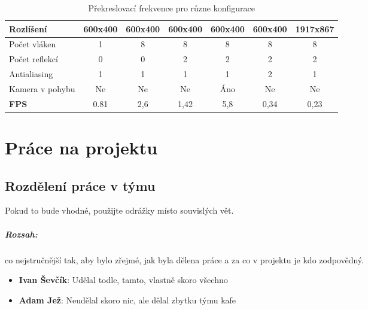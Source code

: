 \documentclass[12pt,a4paper,titlepage,final]{report}
\newcommand\AuthorA{Ivan Ševčík}
\newcommand\AuthorB{Adam Jež}
\begin{document}
\begin{table}[H]
	\begin{center}
		\begin{tabular}{| l | c | c | c | c| c | c |}
			\hline
			Rozlíšení & 600x400 & 600x400 & 600x400 & 600x400 & 600x400 & 1917x867
			\\ \hline
			
			Počet vláken & 1 & 8 & 8 & 8 & 8 & 8
			\\ \hline
			
			Počet reflekcí & 0 & 0 & 2 & 2 & 2 & 2
			\\ \hline
			
			Antialiasing & 1 & 1 & 1 & 1 & 2 & 1
			\\ \hline
			
			Kamera v pohybu & Ne & Ne & Ne & Áno & Ne & Ne
			\\ \hline
			
			\textbf{FPS} & 0.81 & 2,6 & 1,42 & 5,8 & 0,34 & 0,23
			\\ \hline
		\end{tabular}
	\end{center}	
	\caption{Překreslovací frekvence pro různe konfigurace}  
\end{table}

\chapter{Práce na projektu}

\section{Rozdělení práce v týmu}
Pokud to bude vhodné, použijte odrážky místo souvislých vět.

\paragraph{Rozsah:} co nejstručnější tak, aby bylo zřejmé, jak byla dělena práce a za co v
projektu je kdo zodpovědný.

\begin{itemize}
\item \textbf{\AuthorA}: Udělal todle, tamto, vlastně skoro všechno
\item \textbf{\AuthorB}: Neudělal skoro nic, ale dělal zbytku týmu kafe
\end{itemize}
\end{document}
